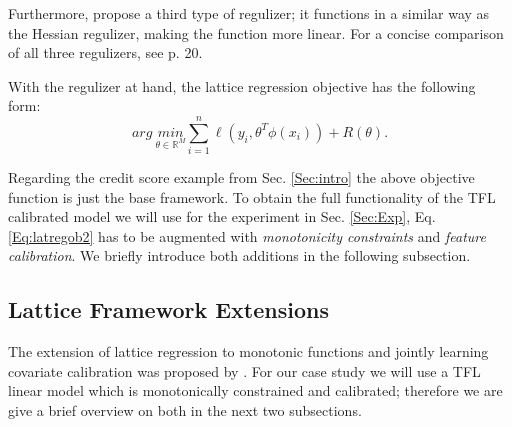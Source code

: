 Furthermore, \citep{gupta2016monotonic} propose a third type of regulizer; it functions in a similar way as the Hessian regulizer, making the function more linear. For a concise comparison of all three regulizers, see p. 20.\medskip 

With the regulizer at hand, the lattice regression objective has the following form:
\begin{equation}
arg\ \underset{\theta \in \mathbb{R}^{M}}{min} \sum_{i = 1}^{n} \ell(y_i, \theta^T \phi(x_i)) + R(\theta).
\label{Eq:latregob2}
\end{equation}

Regarding the credit score example from Sec. \ref{Sec:intro} the above objective function is just the base framework. To obtain the full functionality of the TFL calibrated model we will use for the experiment in Sec. \ref{Sec:Exp}, Eq. \ref{Eq:latregob2} has to be augmented with \textit{monotonicity constraints} and \textit{feature calibration}. We briefly introduce both additions in the following subsection.




\subsection{Lattice Framework Extensions}

The extension of lattice regression to monotonic functions and jointly learning covariate calibration was proposed by \citep{gupta2016monotonic}. For our case study we will use a TFL linear model which is monotonically constrained and calibrated; therefore we are give a brief overview on both in the next two subsections. 

